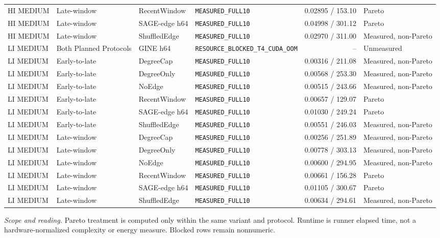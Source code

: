 \begin{longtable}{@{}p{} p{} p{} p{} r p{}@{}}
HI MEDIUM & Late-window & RecentWindow & \texttt{MEASURED\_\allowbreak{}FULL10} & 0.02895 / 153.10 & Pareto \\
HI MEDIUM & Late-window & SAGE-edge h64 & \texttt{MEASURED\_\allowbreak{}FULL10} & 0.04998 / 301.12 & Pareto \\
HI MEDIUM & Late-window & ShuffledEdge & \texttt{MEASURED\_\allowbreak{}FULL10} & 0.02970 / 311.00 & Measured, non-Pareto \\
LI MEDIUM & Both Planned Protocols & GINE h64 & \texttt{RESOURCE\_\allowbreak{}BLOCKED\_\allowbreak{}T4\_\allowbreak{}CUDA\_\allowbreak{}OOM} & -- & Unmeasured \\
LI MEDIUM & Early-to-late & DegreeCap & \texttt{MEASURED\_\allowbreak{}FULL10} & 0.00316 / 211.08 & Measured, non-Pareto \\
LI MEDIUM & Early-to-late & DegreeOnly & \texttt{MEASURED\_\allowbreak{}FULL10} & 0.00568 / 253.30 & Measured, non-Pareto \\
LI MEDIUM & Early-to-late & NoEdge & \texttt{MEASURED\_\allowbreak{}FULL10} & 0.00515 / 243.66 & Measured, non-Pareto \\
LI MEDIUM & Early-to-late & RecentWindow & \texttt{MEASURED\_\allowbreak{}FULL10} & 0.00657 / 129.07 & Pareto \\
LI MEDIUM & Early-to-late & SAGE-edge h64 & \texttt{MEASURED\_\allowbreak{}FULL10} & 0.01030 / 249.24 & Pareto \\
LI MEDIUM & Early-to-late & ShuffledEdge & \texttt{MEASURED\_\allowbreak{}FULL10} & 0.00551 / 246.03 & Measured, non-Pareto \\
LI MEDIUM & Late-window & DegreeCap & \texttt{MEASURED\_\allowbreak{}FULL10} & 0.00256 / 251.89 & Measured, non-Pareto \\
LI MEDIUM & Late-window & DegreeOnly & \texttt{MEASURED\_\allowbreak{}FULL10} & 0.00778 / 303.13 & Measured, non-Pareto \\
LI MEDIUM & Late-window & NoEdge & \texttt{MEASURED\_\allowbreak{}FULL10} & 0.00600 / 294.95 & Measured, non-Pareto \\
LI MEDIUM & Late-window & RecentWindow & \texttt{MEASURED\_\allowbreak{}FULL10} & 0.00661 / 156.28 & Pareto \\
LI MEDIUM & Late-window & SAGE-edge h64 & \texttt{MEASURED\_\allowbreak{}FULL10} & 0.01105 / 300.67 & Pareto \\
LI MEDIUM & Late-window & ShuffledEdge & \texttt{MEASURED\_\allowbreak{}FULL10} & 0.00634 / 294.61 & Measured, non-Pareto \\
\end{longtable}
\noindent\footnotesize\emph{Scope and reading.} Pareto treatment is computed only within the same variant and protocol. Runtime is runner elapsed time, not a hardware-normalized complexity or energy measure. Blocked rows remain nonnumeric.\par
\endgroup
